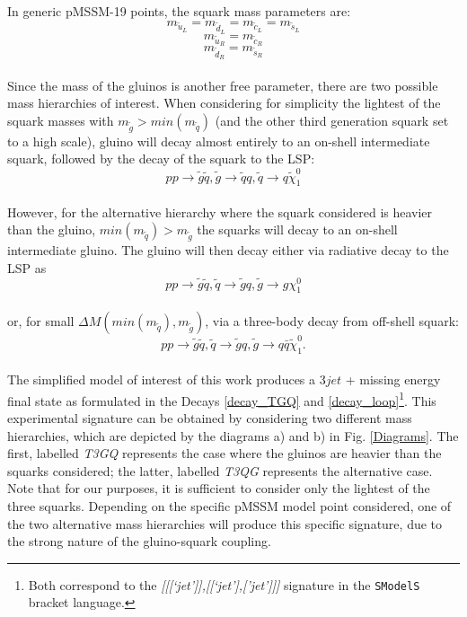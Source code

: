 \documentclass[a4paper,11pt]{article}
\newcommand{\SMO}{\texttt{SModelS\xspace}}
\begin{document}
%
In generic pMSSM-19 points, the squark mass parameters are: 
\begin{equation*}
m_{\tilde u_L} = m_{\tilde d_L} = m_{\tilde c_L} = m_{\tilde s_L} 
\end{equation*}
\begin{equation*}
m_{\tilde u_R} = m_{\tilde c_R} 
\end{equation*}
\begin{equation*}
m_{\tilde d_R} = m_{\tilde s_R}
\end{equation*}
\\
Since the mass of the gluinos is another free parameter, there are two possible mass hierarchies of interest. 
When considering for simplicity the lightest of the squark masses with $m_{\tilde g} > min(m_{\tilde q})$ (and the other third generation squark set to a high scale), gluino will decay almost entirely to an on-shell intermediate squark, followed by the decay of the squark to the LSP:
\begin{equation}\label{decay_TGQ}
p p \rightarrow \tilde g \tilde q , \tilde g \rightarrow \tilde q q , \tilde q \rightarrow q \tilde \chi_1 ^0
\end{equation}
\\
However, for the alternative hierarchy where the squark considered is heavier than the gluino,  $ min(m_{\tilde q}) > m_{\tilde g}$ the squarks will decay to an on-shell intermediate gluino. The gluino will then decay either via radiative decay to the LSP as 
\begin{equation}\label{decay_loop}
p p \rightarrow \tilde g \tilde q ,\tilde q \rightarrow \tilde g q , \tilde g \rightarrow g \chi_1 ^0
\end{equation} 
\\
or, for small $\Delta M(min(m_{\tilde q}), m_{\tilde g})$,  via a three-body decay from off-shell squark:
\begin{equation}
p p \rightarrow \tilde g \tilde q ,\tilde q \rightarrow \tilde g q, \tilde g \rightarrow q \bar q \tilde \chi _1 ^0.
\end{equation}
\\
The simplified model of interest of this work produces a $3jet$ + missing energy final state as formulated in the Decays \ref{decay_TGQ} and \ref{decay_loop}\footnote{Both correspond to the \textit{[[[`jet']],[[`jet'],['jet']]]} signature in the \SMO~ bracket language.}. This experimental signature can be obtained by considering two different mass hierarchies, which are depicted by the diagrams a) and b) in Fig. \ref{Diagrams}. The first, labelled \textit{T3GQ} represents the case where the gluinos are heavier than the squarks considered; the latter, labelled \textit{T3QG} represents the alternative case. Note that for our purposes, it is sufficient to consider only the lightest of the three squarks. Depending on the specific pMSSM model point considered, one of the two alternative mass hierarchies will produce this specific signature, due to the strong nature of the gluino-squark coupling.
\end{document}
